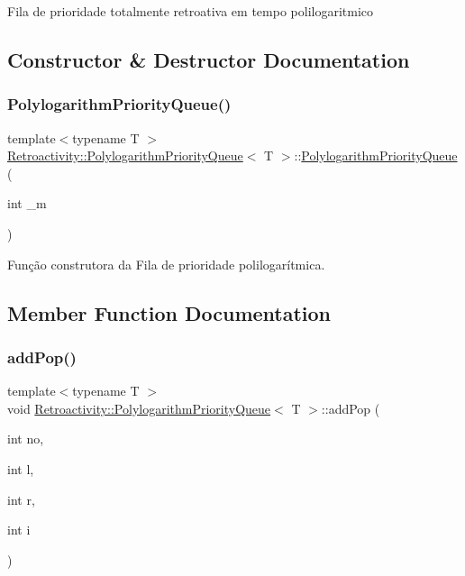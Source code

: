 Fila de prioridade totalmente retroativa em tempo polilogaritmico 

\subsection{Constructor \& Destructor Documentation}
\mbox{\label{classRetroactivity_1_1PolylogarithmPriorityQueue_ab925447d20c941a8f126d20c267052da}} 
\subsubsection{\texorpdfstring{Polylogarithm\+Priority\+Queue()}{PolylogarithmPriorityQueue()}}
{\footnotesize\ttfamily template$<$typename T $>$ \\
\hyperlink{classRetroactivity_1_1PolylogarithmPriorityQueue}{Retroactivity\+::\+Polylogarithm\+Priority\+Queue}$<$ T $>$\+::\hyperlink{classRetroactivity_1_1PolylogarithmPriorityQueue}{Polylogarithm\+Priority\+Queue} (\begin{DoxyParamCaption}\item[{int}]{\+\_\+m }\end{DoxyParamCaption})}

Função construtora da Fila de prioridade polilogarítmica. 

\subsection{Member Function Documentation}
\mbox{\label{classRetroactivity_1_1PolylogarithmPriorityQueue_afc4926b8969ceb49e18eec4bcfedc054}} 
\subsubsection{\texorpdfstring{add\+Pop()}{addPop()}}
{\footnotesize\ttfamily template$<$typename T $>$ \\
void \hyperlink{classRetroactivity_1_1PolylogarithmPriorityQueue}{Retroactivity\+::\+Polylogarithm\+Priority\+Queue}$<$ T $>$\+::add\+Pop (\begin{DoxyParamCaption}\item[{int}]{no,  }\item[{int}]{l,  }\item[{int}]{r,  }\item[{int}]{i }\end{DoxyParamCaption})}

